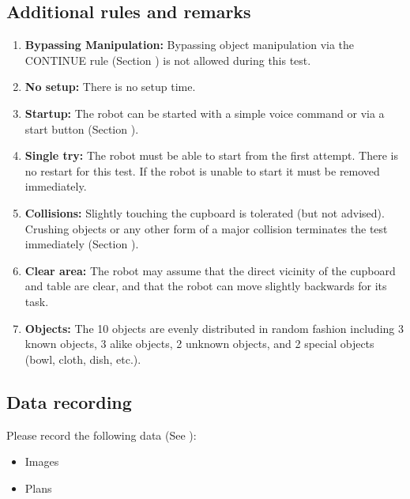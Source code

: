 
%
%
\subsection{Additional rules and remarks}
\begin{enumerate}
	\item \textbf{Bypassing Manipulation:} Bypassing object manipulation via the CONTINUE rule (Section ) is not allowed during this test.
	\item \textbf{No setup:} There is no setup time.
	\item \textbf{Startup:} The robot can be started with a simple voice command or via a start button (Section ).
	\item \textbf{Single try:} The robot must be able to start from the first attempt. There is no restart for this test. If the robot is unable to start it must be removed immediately.
	\item \textbf{Collisions:} Slightly touching the cupboard is tolerated (but not advised). Crushing objects or any other form of a major collision terminates the test immediately (Section ).
	\item \textbf{Clear area:} The robot may assume that the direct vicinity of the cupboard and table are clear, and that the robot can move slightly backwards for its task.
	\item \textbf{Objects:} The 10 objects are evenly distributed in random fashion including
	3 known objects,
	3 alike objects,
	2 unknown objects, and
	2 special objects (bowl, cloth, dish, etc.).
\end{enumerate}

\subsection{Data recording}
Please record the following data (See ):
\begin{itemize}
	\item Images
	\item Plans
\end{itemize}

